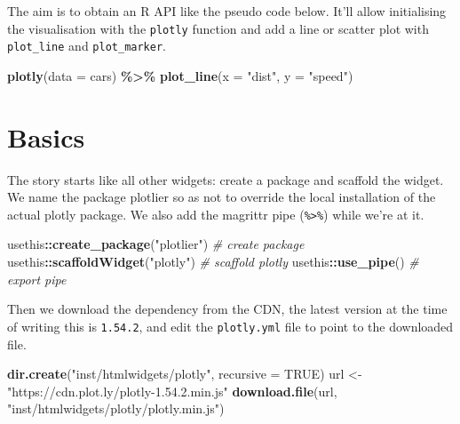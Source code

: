 \documentclass[
]{krantz}
\makeatletter
\newenvironment{Shaded}{\begin{snugshade}}{\end{snugshade}}
\newcommand{\CommentTok}[1]{\textcolor[rgb]{0.37,0.37,0.37}{\textit{#1}}}
\newcommand{\DataTypeTok}[1]{\textcolor[rgb]{0.27,0.27,0.27}{#1}}
\newcommand{\KeywordTok}[1]{\textcolor[rgb]{0.27,0.27,0.27}{\textbf{#1}}}
\newcommand{\NormalTok}[1]{#1}
\newcommand{\OperatorTok}[1]{\textcolor[rgb]{0.43,0.43,0.43}{\textbf{#1}}}
\newcommand{\OtherTok}[1]{\textcolor[rgb]{0.37,0.37,0.37}{#1}}
\newcommand{\StringTok}[1]{\textcolor[rgb]{0.5,0.5,0.5}{#1}}
\newenvironment{kframe}{%
\medskip{}
\setlength{\fboxsep}{.8em}
 \def\at@end@of@kframe{}%
 \ifinner\ifhmode%
  \def\at@end@of@kframe{\end{minipage}}%
  \begin{minipage}{\columnwidth}%
 \fi\fi%
 \def\FrameCommand##1{\hskip\@totalleftmargin \hskip-\fboxsep
 \colorbox{shadecolor}{##1}\hskip-\fboxsep
     \hskip-\linewidth \hskip-\@totalleftmargin \hskip\columnwidth}%
 \MakeFramed {\advance\hsize-\width
   \@totalleftmargin\z@ \linewidth\hsize
   \@setminipage}}%
 {\par\unskip\endMakeFramed%
 \at@end@of@kframe}
\renewenvironment{Shaded}{\begin{kframe}}{\end{kframe}}
\makeatother
\begin{document}
The aim is to obtain an R API like the pseudo code below. It'll allow initialising the visualisation with the \texttt{plotly} function and add a line or scatter plot with \texttt{plot\_line} and \texttt{plot\_marker}.

\begin{Shaded}
\begin{Highlighting}[]
\KeywordTok{plotly}\NormalTok{(}\DataTypeTok{data =}\NormalTok{ cars) }\OperatorTok{\%\textgreater{}\%}\StringTok{ }
\StringTok{  }\KeywordTok{plot\_line}\NormalTok{(}\DataTypeTok{x =} \StringTok{"dist"}\NormalTok{, }\DataTypeTok{y =} \StringTok{"speed"}\NormalTok{)}
\end{Highlighting}
\end{Shaded}

\hypertarget{basics-3}{%
\section*{Basics}\label{basics-3}}


The story starts like all other widgets: create a package and scaffold the widget. We name the package plotlier so as not to override the local installation of the actual plotly package. We also add the magrittr pipe (\texttt{\%\textgreater{}\%}) while we're at it.

\begin{Shaded}
\begin{Highlighting}[]
\NormalTok{usethis}\OperatorTok{::}\KeywordTok{create\_package}\NormalTok{(}\StringTok{"plotlier"}\NormalTok{) }\CommentTok{\# create package}
\NormalTok{usethis}\OperatorTok{::}\KeywordTok{scaffoldWidget}\NormalTok{(}\StringTok{"plotly"}\NormalTok{) }\CommentTok{\# scaffold plotly}
\NormalTok{usethis}\OperatorTok{::}\KeywordTok{use\_pipe}\NormalTok{() }\CommentTok{\# export pipe}
\end{Highlighting}
\end{Shaded}

Then we download the dependency from the CDN, the latest version at the time of writing this is \texttt{1.54.2}, and edit the \texttt{plotly.yml} file to point to the downloaded file.

\begin{Shaded}
\begin{Highlighting}[]
\KeywordTok{dir.create}\NormalTok{(}\StringTok{"inst/htmlwidgets/plotly"}\NormalTok{, }\DataTypeTok{recursive =} \OtherTok{TRUE}\NormalTok{)}
\NormalTok{url \textless{}{-}}\StringTok{ "https://cdn.plot.ly/plotly{-}1.54.2.min.js"}
\KeywordTok{download.file}\NormalTok{(url, }\StringTok{"inst/htmlwidgets/plotly/plotly.min.js"}\NormalTok{)}
\end{Highlighting}
\end{Shaded}
\end{document}
